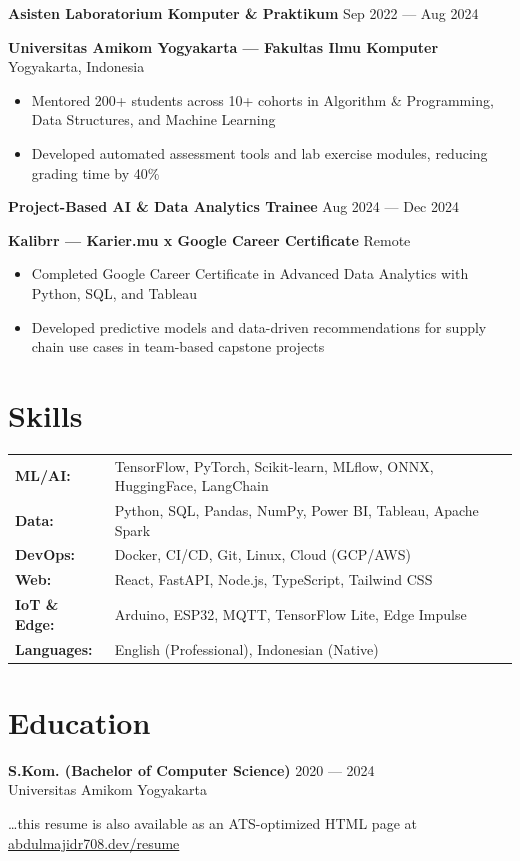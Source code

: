 \documentclass[11pt,a4paper]{article}
\newcommand{\role}[2]{%
  {\normalsize\bfseries\color{heading}#1} \hfill {\footnotesize\color{muted}#2}%
}
\newcommand{\company}[2]{%
  {\small\color{accent}\bfseries#1} \hfill {\footnotesize\color{muted}#2}%
}
\begin{document}
\role{Asisten Laboratorium Komputer \& Praktikum}{Sep 2022 --- Aug 2024}
\company{Universitas Amikom Yogyakarta — Fakultas Ilmu Komputer}{Yogyakarta, Indonesia}
\begin{itemize}
  \item Mentored 200+ students across 10+ cohorts in Algorithm \& Programming, Data Structures, and Machine Learning
  \item Developed automated assessment tools and lab exercise modules, reducing grading time by 40\%
\end{itemize}

\role{Project-Based AI \& Data Analytics Trainee}{Aug 2024 --- Dec 2024}
\company{Kalibrr — Karier.mu x Google Career Certificate}{Remote}
\begin{itemize}
  \item Completed Google Career Certificate in Advanced Data Analytics with Python, SQL, and Tableau
  \item Developed predictive models and data-driven recommendations for supply chain use cases in team-based capstone projects
\end{itemize}

\section{Skills}

\begin{tabular}{@{}p{3cm} p{\dimexpr\linewidth-3cm\relax}}
\textbf{\color{heading}ML/AI:}      & TensorFlow, PyTorch, Scikit-learn, MLflow, ONNX, HuggingFace, LangChain \\
\textbf{\color{heading}Data:}        & Python, SQL, Pandas, NumPy, Power BI, Tableau, Apache Spark \\
\textbf{\color{heading}DevOps:}      & Docker, CI/CD, Git, Linux, Cloud (GCP/AWS) \\
\textbf{\color{heading}Web:}         & React, FastAPI, Node.js, TypeScript, Tailwind CSS \\
\textbf{\color{heading}IoT \& Edge:} & Arduino, ESP32, MQTT, TensorFlow Lite, Edge Impulse \\
\textbf{\color{heading}Languages:}   & English (Professional), Indonesian (Native)
\end{tabular}

\section{Education}

{\normalsize\bfseries\color{heading} S.Kom. (Bachelor of Computer Science)} \hfill {\footnotesize\color{muted} 2020 --- 2024}\\[0.1em]
{\small\color{muted} Universitas Amikom Yogyakarta}

\vfill
\begin{center}
  {\footnotesize\color{muted} \dots this resume is also available as an ATS-optimized HTML page at \href{https://abdulmajidr708.dev/resume}{abdulmajidr708.dev/resume}}
\end{center}
\end{document}
